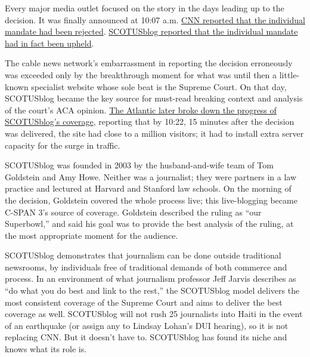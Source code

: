 Every major media outlet focused on the story in the days leading up to the decision.
It was finally announced at 10:07 a.m. \href{http://www.slate.com/blogs/browbeat/2012/06/28/aca_mandate_struck_down_cnn_and_fox_misreport_the_historic_decision_.html}{CNN reported that the individual
mandate had been rejected}. \href{http://www.scotusblog.com/2012/06/the-mandate-is-constitutional-in-plain-english/}{SCOTUSblog reported that the individual mandate
had in fact been upheld}.

The cable news network’s embarrassment in reporting the decision erroneously
was exceeded only by the breakthrough moment for what was until then a
little-known specialist website whose sole beat is the Supreme Court. On that
day, SCOTUSblog became the key source for must-read breaking context and
analysis of the court’s ACA opinion. \href{http://www.theatlantic.com/technology/archive/2012/06/internet-gone-wild-scotusblog-explodes-with-health-care-enthusiasm/259108/}{The Atlantic later broke down the progress
of SCOTUSblog’s coverage}, reporting that by 10:22, 15 minutes after the decision
was delivered, the site had close to a million visitors; it had to install extra
server capacity for the surge in traffic.

SCOTUSblog was founded in 2003 by the husband-and-wife team of Tom
Goldstein and Amy Howe. Neither was a journalist; they were partners in a law
practice and lectured at Harvard and Stanford law schools. On the morning of
the decision, Goldstein covered the whole process live; this live-blogging became
C-SPAN 3’s source of coverage. Goldstein described the ruling as ``our Superbowl,''
and said his goal was to provide the best analysis of the ruling, at the most
appropriate moment for the audience.

SCOTUSblog demonstrates that journalism can be done outside traditional
newsrooms, by individuals free of traditional demands of both commerce and
process. In an environment of what journalism professor Jeff Jarvis describes as
``do what you do best and link to the rest,'' the SCOTUSblog model delivers
the most consistent coverage of the Supreme Court and aims to deliver the best coverage as well. SCOTUSblog will not rush 25 journalists into Haiti in the
event of an earthquake (or assign any to Lindsay Lohan’s DUI hearing), so it is
not replacing CNN. But it doesn’t have to. SCOTUSblog has found its niche and
knows what its role is.

